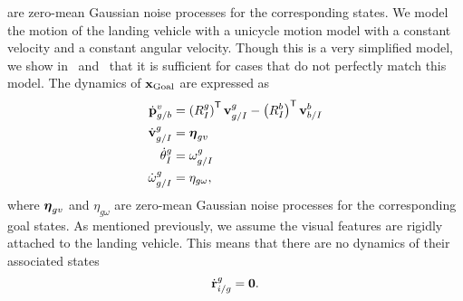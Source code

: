 are zero-mean Gaussian noise processes for the corresponding states.
We model the motion of the landing vehicle with a unicycle motion model
with a constant velocity and a constant
angular velocity. Though this is a very simplified model, we show
in~ and~ that it is sufficient for
cases that do not perfectly match this model. The dynamics of $\boldsymbol{\mathrm{x}}_{\text{Goal}}$ are expressed as
\begin{align}
  \dot{\vect{p}}_{g/b}^{v} &= \left( R_{I}^{g} \right)^\transpose
  \vect{v}_{g/I}^{g} - \left( R_{I}^{b} \right)^\transpose
  \vect{v}_{b/I}^{b} \label{eq:goal_dynamics} \\
  \dot{\vect{v}}_{g/I}^{g} &= \vect{\eta}_{gv} \nonumber \\
  \dot{\theta}_{I}^{g} &= \omega_{g/I}^g \nonumber \\
  \dot{\omega}_{g/I}^{g} &= \eta_{g\omega} \nonumber,
\end{align}
where $\boldsymbol{\mathrm{\eta}}_{gv}$ and $\eta_{g\omega}$ are zero-mean Gaussian noise
processes for the corresponding goal states.
As mentioned previously, we assume the visual features are rigidly
attached to the landing vehicle. This means that there are no dynamics 
of their associated states
\begin{equation}
  \dot{\vect{r}}_{i/g}^g = \vect{0}. \label{eq:feature_dynamics}
\end{equation}

